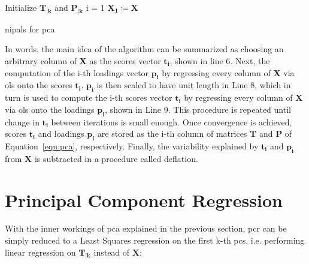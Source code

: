 \begin{algorithm}[H]
	\DontPrintSemicolon
	\label{algo:pca-nipals}
	\SetAlgoLined
	Initialize $\mathbf{T_{|k}}$ and $\mathbf{P_{|k}}$\;
	i = 1\;
	$\mathbf{X_1 \coloneqq X}$\;
	
	
	\caption{\acrfull{nipals} for \acrshort{pca}}
\end{algorithm}

In words, the main idea of the algorithm can be summarized as choosing an arbitrary column of $\mathbf{X}$ as the scores vector $\mathbf{t_i}$, shown in line 6. Next, the computation of the i-th loadings vector $\mathbf{p_i}$ by regressing every column of $\mathbf{X}$ via \acrshort{ols} onto the scores $\mathbf{t_i}$.  $\mathbf{p_i}$ is then scaled to have unit length in Line 8, which in turn is used to compute the i-th scores vector $\mathbf{t_i}$ by regressing every column of $\mathbf{X}$ via \acrshort{ols} onto the loadings $\mathbf{p_i}$, shown in Line 9. This procedure is repeated until change in $\mathbf{t_i}$ between iterations is small enough. Once convergence is achieved, scores $\mathbf{t_i}$ and loadings $\mathbf{p_i}$ are stored as the i-th column of matrices $\mathbf{T}$ and $\mathbf{P}$ of Equation~\ref{eqn:pca}, respectively. Finally, the variability explained by $\mathbf{t_i}$ and $\mathbf{p_i}$ from $\mathbf{X}$ is subtracted in a procedure called deflation.

\section{Principal Component Regression}
\label{sec:pcr}

With the inner workings of \acrshort{pca} explained in the previous section, \acrshort{pcr} can be simply reduced to a Least Squares regression on the first k-th \acrshort{pc}s, i.e. performing linear regression on $\mathbf{T_{|k}}$ instead of $\mathbf{X}$:
	
